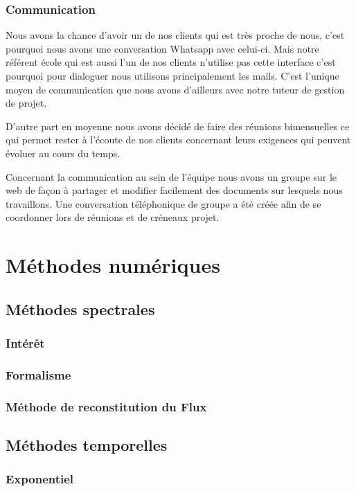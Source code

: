 \documentclass[a4paper,12pt]{report}
\theoremstyle{break}
\begin{document}
\section{Communication }

    Nous avons la chance d’avoir un de nos clients qui est très proche de nous, c’est pourquoi nous avons une conversation Whatsapp avec celui-ci. Mais notre référent école qui est aussi l’un de nos clients n’utilise pas cette interface c’est pourquoi pour dialoguer nous utilisons principalement les mails. C’est l’unique moyen de communication que nous avons d’ailleurs avec notre tuteur de gestion de projet. 
    
    D’autre part en moyenne nous avons décidé de faire des réunions bimensuelles ce qui permet rester à l’écoute de nos clients concernant leurs exigences qui peuvent évoluer au cours du temps. 
    
    Concernant la communication au sein de l’équipe nous avons un groupe sur le web de façon à partager et modifier facilement des documents sur lesquels nous travaillons. Une conversation téléphonique de groupe a été créée afin de se coordonner lors de réunions et de créneaux projet. 

\part{Méthodes numériques}
\chapter{Méthodes spectrales}
\section{Intérêt}
\section{Formalisme}
\section{Méthode de reconstitution du Flux}

\chapter{Méthodes temporelles}
\section{Exponentiel}
\end{document}
